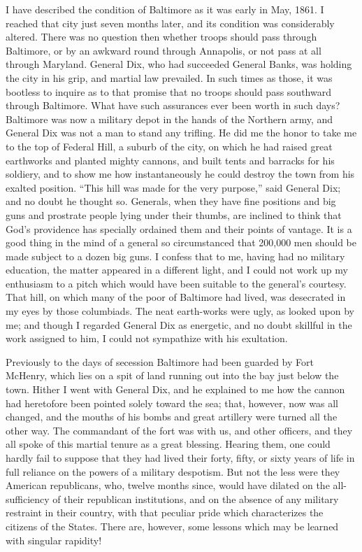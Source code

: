 I have described the condition of Baltimore as it was early in May,
1861.  I reached that city just seven months later, and its
condition was considerably altered.  There was no question then
whether troops should pass through Baltimore, or by an awkward
round through Annapolis, or not pass at all through Maryland.
General Dix, who had succeeded General Banks, was holding the city
in his grip, and martial law prevailed.  In such times as those, it
was bootless to inquire as to that promise that no troops should
pass southward through Baltimore.  What have such assurances ever
been worth in such days?  Baltimore was now a military depot in the
hands of the Northern army, and General Dix was not a man to stand
any trifling.  He did me the honor to take me to the top of Federal
Hill, a suburb of the city, on which he had raised great earthworks
and planted mighty cannons, and built tents and barracks for his
soldiery, and to show me how instantaneously he could destroy the
town from his exalted position.  ``This hill was made for the very
purpose,'' said General Dix; and no doubt he thought so.  Generals,
when they have fine positions and big guns and prostrate people
lying under their thumbs, are inclined to think that God's
providence has specially ordained them and their points of vantage.
It is a good thing in the mind of a general so circumstanced that
200,000 men should be made subject to a dozen big guns.  I confess
that to me, having had no military education, the matter appeared
in a different light, and I could not work up my enthusiasm to a
pitch which would have been suitable to the general's courtesy.
That hill, on which many of the poor of Baltimore had lived, was
desecrated in my eyes by those columbiads.  The neat earth-works
were ugly, as looked upon by me; and though I regarded General Dix
as energetic, and no doubt skillful in the work assigned to him, I
could not sympathize with his exultation.

Previously to the days of secession Baltimore had been guarded by
Fort McHenry, which lies on a spit of land running out into the bay
just below the town.  Hither I went with General Dix, and he
explained to me how the cannon had heretofore been pointed solely
toward the sea; that, however, now was all changed, and the mouths
of his bombs and great artillery were turned all the other way.
The commandant of the fort was with us, and other officers, and
they all spoke of this martial tenure as a great blessing.  Hearing
them, one could hardly fail to suppose that they had lived their
forty, fifty, or sixty years of life in full reliance on the powers
of a military despotism.  But not the less were they American
republicans, who, twelve months since, would have dilated on the
all-sufficiency of their republican institutions, and on the
absence of any military restraint in their country, with that
peculiar pride which characterizes the citizens of the States.
There are, however, some lessons which may be learned with singular
rapidity!

